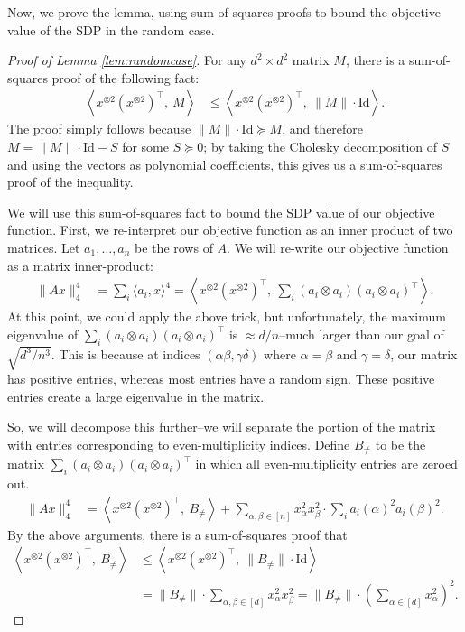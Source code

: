 \documentclass[a4paper,11pt]{article}
\newcommand{\Id}{\mathrm{Id}}
\theoremstyle{definition}
\begin{document}
Now, we prove the lemma, using sum-of-squares proofs to bound the objective value of the SDP in the random case.
\begin{proof}[Proof of Lemma \ref{lem:randomcase}]
For any $d^2 \times d^2$ matrix $M$,  there is a sum-of-squares proof of the following fact:
\begin{align*}
\left\langle x^{\otimes 2}(x^{\otimes 2})^{\top}, \ M\right\rangle
&\le 
\left\langle x^{\otimes 2}(x^{\otimes 2})^{\top}, \ \|M\|\cdot \Id \right\rangle.
\end{align*}
The proof simply follows because $\|M\|\cdot \Id \succeq M$, and therefore $M = \|M\|\cdot \Id - S$ for some $S \succeq 0$; by taking the Cholesky decomposition of $S$ and using the vectors as polynomial coefficients, this gives us a sum-of-squares proof of the inequality.

We will use this sum-of-squares fact to bound the SDP value of our objective function.
First, we re-interpret our objective function as an inner product of two matrices.
Let $a_1,\ldots,a_n$ be the rows of $A$. 
We will re-write our objective function as a matrix inner-product:
\begin{align*}
\|Ax\|^4_4
&= \sum_{i}\langle a_i, x \rangle^4
= \left\langle x^{\otimes 2}(x^{\otimes 2})^{\top}, \ \sum_i (a_i \otimes a_i)(a_i \otimes a_i)^{\top}\right\rangle.
\end{align*}
At this point, we could apply the above trick, but unfortunately, the maximum eigenvalue of $\sum_i (a_i\otimes a_i)(a_i \otimes a_i)^{\top}$ is $\approx d/n$--much larger than our goal of $\sqrt{d^3/n^3}$. 
This is because at indices $(\alpha\beta,\gamma\delta)$ where $\alpha = \beta$ and $\gamma = \delta$, our matrix has positive entries, whereas most entries have a random sign.
These positive entries create a large eigenvalue in the matrix.


So, we will decompose this further--we will separate the portion of the matrix with entries corresponding to even-multiplicity indices.
Define $B_{\neq}$ to be the matrix $\sum_{i} (a_i \otimes a_i)(a_i \otimes a_i)^{\top}$ in which all even-multiplicity entries are zeroed out.
\begin{align*}
\|Ax\|^4_4
&= \left\langle x^{\otimes 2}(x^{\otimes 2})^{\top}, \ B_{\neq} \right\rangle + \sum_{\alpha,\beta \in [n]} x_{\alpha}^2x_{\beta}^2\cdot \sum_{i} a_{i}(\alpha)^2 a_{i}(\beta)^2.
\end{align*}
By the above arguments, there is a sum-of-squares proof that
\begin{align*}
\left\langle x^{\otimes 2}(x^{\otimes 2})^{\top}, \ B_{\neq}\right\rangle
&\le 
\left\langle x^{\otimes 2}(x^{\otimes 2})^{\top}, \ \|B_{\neq}\|\cdot \Id \right\rangle\\
&=  \|B_{\neq}\|\cdot \sum_{\alpha,\beta\in[d]} x_\alpha^2 x_{\beta}^2 
= \|B_{\neq}\|\cdot \left(\sum_{\alpha\in[d]} x_{\alpha}^2 \right)^2.
\end{align*}


\end{proof}
\end{document}
